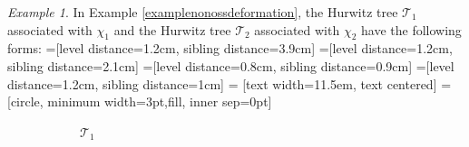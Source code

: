 \documentclass{compositio}
\theoremstyle{remark}
\newtheorem{example}[theorem]{Example}
\theoremstyle{remark}
\begin{document}
\begin{example}
\label{examplenonossdeformationHurwitz}
In Example \ref{examplenonossdeformation}, the Hurwitz tree $\mathcal{T}_1$ associated with $\chi_1$ and the Hurwitz tree $\mathcal{T}_2$ associated with $\chi_2$ have the following forms:
=[level distance=1.2cm, sibling distance=3.9cm]
=[level distance=1.2cm, sibling distance=2.1cm]
=[level distance=0.8cm, sibling distance=0.9cm]
=[level distance=1.2cm, sibling distance=1cm]
 = [text width=11.5em, text centered]
 = [circle, minimum width=3pt,fill, inner sep=0pt]
\begin{figure}[h]
\begin{subfigure}{.5\textwidth}
  \centering
{}
  \caption{$\mathcal{T}_1$}
  \label{figexamplenonossdeformationtree1}
\end{subfigure}%
\begin{subfigure}{.5\textwidth}
  \centering
{}
\end{subfigure}
\end{figure}
\end{example}
\end{document}
